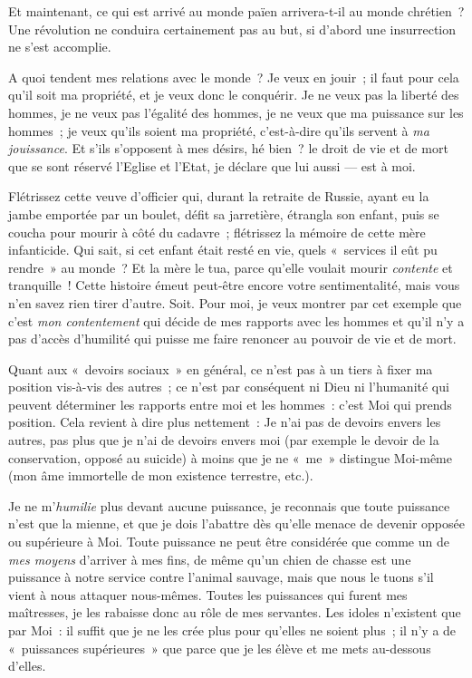 \documentclass[french,twoside]{book} %
\begin{document}
Et maintenant, ce qui est arrivé au monde païen arrivera-t-il au monde chrétien ? Une révolution ne conduira certainement pas au but, si d’abord une insurrection ne s’est accomplie.\par
A quoi tendent mes relations avec le monde ? Je veux en jouir ; il faut pour cela qu’il soit ma propriété, et je veux donc le conquérir. Je ne veux pas la liberté des hommes, je ne veux pas l’égalité des hommes, je ne veux que ma puissance sur les hommes ; je veux qu’ils soient ma propriété, c’est-à-dire qu’ils servent à \emph{ma jouissance}. Et s’ils s’opposent à mes désirs, hé bien ? le droit de vie et de mort que se sont réservé l’Eglise et l’Etat, je déclare que lui aussi — est à moi.\par
Flétrissez cette veuve d’officier qui, durant la retraite de Russie, ayant eu la jambe emportée par un boulet, défit sa jarretière, étrangla son enfant, puis se coucha pour mourir à côté du cadavre ; flétrissez la mémoire de cette mère infanticide. Qui sait, si cet enfant était resté en vie, quels « services il eût pu rendre » au monde ? Et la mère le tua, parce qu’elle voulait mourir \emph{contente} et tranquille ! Cette histoire émeut peut-être encore votre sentimentalité, mais vous n’en savez rien tirer d’autre. Soit. Pour moi, je veux montrer par cet exemple que c’est \emph{mon contentement} qui décide de mes rapports avec les hommes et qu’il n’y a pas  d’accès d’humilité qui puisse me faire renoncer au pouvoir de vie et de mort.\par
Quant aux « devoirs sociaux » en général, ce n’est pas à un tiers à fixer ma position vis-à-vis des autres ; ce n’est par conséquent ni Dieu ni l’humanité qui peuvent déterminer les rapports entre moi et les hommes : c’est Moi qui prends position. Cela revient à dire plus nettement : Je n’ai pas de devoirs envers les autres, pas plus que je n’ai de devoirs envers moi (par exemple le devoir de la conservation, opposé au suicide) à moins que je ne « me » distingue Moi-même (mon âme immortelle de mon existence terrestre, etc.).\par
Je ne m’\emph{humilie} plus devant aucune puissance, je reconnais que toute puissance n’est que la mienne, et que je dois l’abattre dès qu’elle menace de devenir opposée ou supérieure à Moi. Toute puissance ne peut être considérée que comme un de \emph{mes moyens }d’arriver à mes fins, de même qu’un chien de chasse est une puissance à notre service contre l’animal sauvage, mais que nous le tuons s’il vient à nous attaquer nous-mêmes. Toutes les puissances qui furent mes maîtresses, je les rabaisse donc au rôle de mes servantes. Les idoles n’existent que par Moi : il suffit que je ne les crée plus pour qu’elles ne soient plus ; il n’y a de « puissances supérieures » que parce que je les élève et me mets au-dessous d’elles.\par
\end{document}
